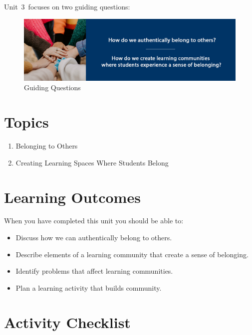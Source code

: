 \documentclass[
]{book}
\providecommand{\tightlist}{%
  \setlength{\itemsep}{0pt}\setlength{\parskip}{0pt}}
\begin{document}
Unit~3~focuses on two guiding questions:

\begin{figure}
\centering
\includegraphics{assets/unit3/LDRS664-BannerUnit3.jpg}
\caption{Guiding Questions}
\end{figure}

\hypertarget{topics-2}{%
\section*{Topics}\label{topics-2}}

\begin{enumerate}
\def\labelenumi{\arabic{enumi}.}
\tightlist
\item
  Belonging to Others
\item
  Creating Learning Spaces Where Students Belong
\end{enumerate}

\hypertarget{learning-outcomes-2}{%
\section*{Learning Outcomes}\label{learning-outcomes-2}}

When you have completed this unit you should be able to:

\begin{itemize}
\item
  Discuss how we can authentically belong to others.
\item
  Describe elements of a learning community that create a sense of
  belonging.
\item
  Identify problems that affect learning communities.
\item
  Plan a learning activity that builds community.
\end{itemize}

\hypertarget{activity-checklist-2}{%
\section*{Activity Checklist}\label{activity-checklist-2}}
\end{document}
